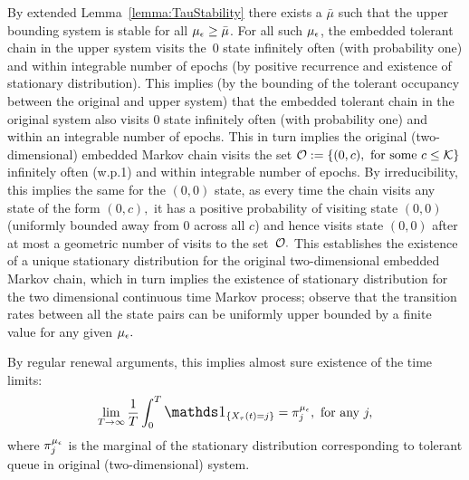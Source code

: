 {By extended Lemma~\ref{lemma:TauStability} there exists a ${\bar \mu}$
such that the upper bounding system is stable for all
${\mu_\epsilon} \ge {\bar \mu}$. For all such ${\mu_\epsilon}$, the embedded tolerant
chain in the upper system visits the~$0$ state infinitely often (with
probability one) and within integrable number of epochs (by positive
recurrence and existence of stationary distribution). This implies (by
the bounding of the tolerant occupancy between the original and upper
system) that the embedded tolerant chain in the original system also
visits $0$ state infinitely often (with probability one) and within an
integrable number of epochs. This in turn implies the original
(two-dimensional) embedded Markov chain visits the set
$ {\cal O}:= \{ (0, c), \mbox{ for some } c \le {\cal K} \}$
infinitely often (w.p.1) and within integrable number of epochs.  By
irreducibility, this implies the same for the $(0,0)$ state, as every
time the chain visits any state of the form $(0,c),$ it has a positive
probability of visiting state $(0, 0)$ (uniformly bounded away from 0
across all $c$) and hence visits state $(0,0)$ after at most a
geometric number of visits to the set~${\cal O}.$ This establishes the
existence of a unique stationary distribution
for the original two-dimensional embedded Markov chain, which in turn
implies the existence of stationary distribution for the two
dimensional continuous time Markov process; observe that the
transition rates between all the state pairs can be uniformly upper
bounded by a finite value for any given ${\mu_\epsilon}.$
 
By regular renewal arguments, this implies almost sure existence of
the time limits:
 \begin{eqnarray}
\label{Eqn_SD_marginal}
\lim_{T \to \infty}  \frac{1}{T} \int_0^T  \indc_{ \{X_\tau(t) = j \}}  =  \pi_j^\mue, \mbox{ for any } j, 
\end{eqnarray}
where $\pi_j^{\mu_\epsilon}$ is the marginal of the stationary distribution
corresponding to tolerant queue in original (two-dimensional) system.

}
